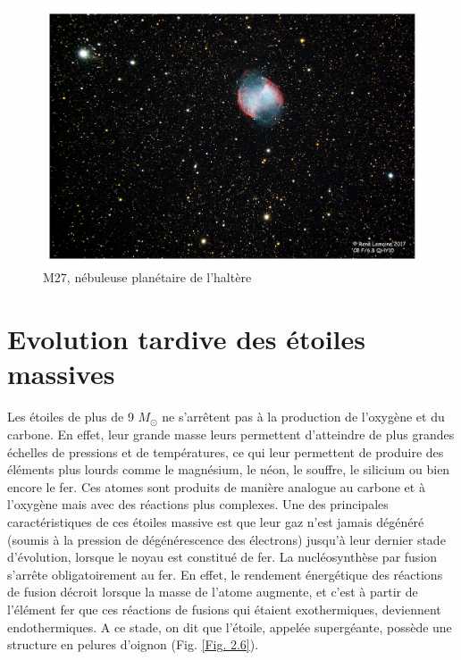 \begin{figure}[H]\vspace{1cm}
	\centering
	\includegraphics[scale=0.4]{images/m27}
	\caption[M27, nébuleuse planétaire de l'haltère - astrophoto prise par René Lemoine le 30 juillet 2017 avec un Celestron 8 (1h50 de pose)]{M27, nébuleuse planétaire de l'haltère}
	\label{Fig. 2.5}
\end{figure}  

\section{Evolution tardive des étoiles massives}\label{2.4}

Les étoiles de plus de 9 $M_\odot$ ne s’arrêtent pas à la production de l’oxygène et du carbone. En effet, leur grande masse leurs permettent d’atteindre de plus grandes échelles de pressions et de températures, ce qui leur permettent de produire des éléments plus lourds comme le magnésium, le néon, le souffre, le silicium ou bien encore le fer. Ces atomes sont produits de manière analogue au carbone et à l’oxygène mais avec des réactions plus complexes. Une des principales caractéristiques de ces étoiles massive est que leur gaz n’est jamais dégénéré (soumis à la pression de dégénérescence des électrons) jusqu’à leur dernier stade d’évolution, lorsque le noyau est constitué de fer. La nucléosynthèse par fusion s’arrête obligatoirement au fer. En effet, le rendement énergétique des réactions de fusion décroit lorsque la masse de l’atome augmente, et c’est à partir de l’élément fer que ces réactions de fusions qui étaient exothermiques, deviennent endothermiques. A ce stade, on dit que l’étoile, appelée supergéante, possède une structure en pelures d’oignon (Fig. \ref{Fig. 2.6}).

